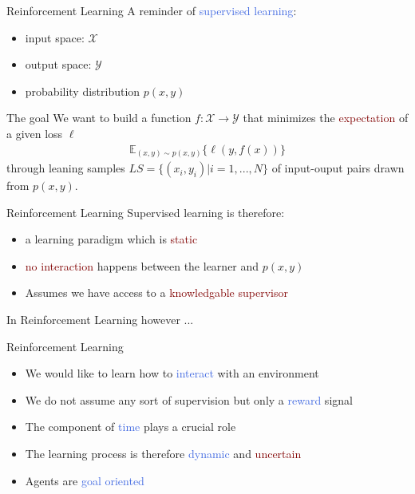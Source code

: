 \documentclass{beamer}
\begin{document}
\begin{frame}{Reinforcement Learning}
	A reminder of \textcolor{RoyalBlue}{supervised learning}:
	\begin{itemize}
		\item input space: $\mathcal{X}$
		\item output space: $\mathcal{Y}$
		\item probability distribution $p(x,y)$
	\end{itemize}

	\begin{block}{The goal}
		We want to build a function $f:\mathcal{X}\rightarrow\mathcal{Y}$ that minimizes the \textcolor{Maroon}{expectation} of a given loss $\ell$
		\begin{align*}
			\mathds{E}_{(x,y)\sim p(x,y)}\{\ell(y,f(x)) \}
		\end{align*}
		through leaning samples $LS=\{(x_i,y_i)|i=1,...,N\}$ of input-ouput pairs drawn from $p(x,y)$.
	\end{block}

\end{frame}

\begin{frame}{Reinforcement Learning}
	Supervised learning is therefore:
	\begin{itemize}
		\item a learning paradigm which is \textcolor{Maroon}{static}
		\item \textcolor{Maroon}{no interaction} happens between the learner and $p(x,y)$
		\item Assumes we have access to a \textcolor{Maroon}{knowledgable supervisor}
	\end{itemize}

	\bigskip
	In Reinforcement Learning however ...

\end{frame}

\begin{frame}{Reinforcement Learning}
	\begin{itemize}
		\item We would like to learn how to \textcolor{RoyalBlue}{interact} with an environment 
		\item We do not assume any sort of supervision but only a \textcolor{RoyalBlue}{reward} signal
		\item The component of \textcolor{RoyalBlue}{time} plays a crucial role
		\item The learning process is therefore \textcolor{RoyalBlue}{dynamic} and \textcolor{Maroon}{uncertain} 
		\item Agents are \textcolor{RoyalBlue}{goal oriented}
	\end{itemize}

\end{frame}
\end{document}
